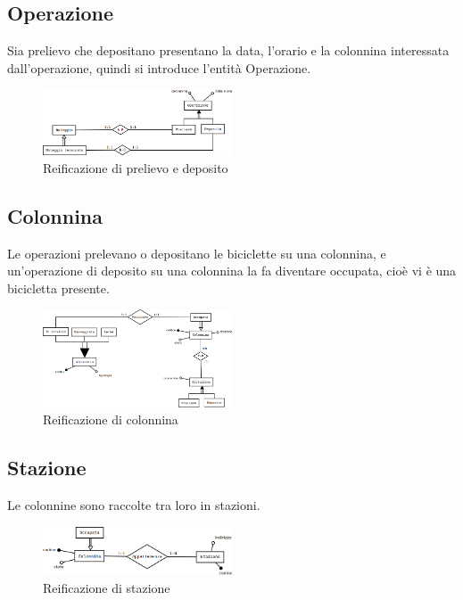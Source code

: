 \documentclass[a4paper,twoside]{article}
\begin{document}
\subsection{Operazione}
Sia prelievo che depositano presentano la data, l'orario e la colonnina interessata dall'operazione, quindi si introduce l'entità Operazione.
\begin{figure}[H]
 \centering
  \includegraphics[width=0.5\textwidth]{Immagini-Grafici/Concettuale07.png}
\caption{Reificazione di prelievo e deposito}
\end{figure}

\subsection{Colonnina}
Le operazioni prelevano o depositano le biciclette su una colonnina, e un'operazione di deposito su una colonnina la fa diventare occupata, cioè vi è una bicicletta presente.
\begin{figure}[H]
 \centering
  \includegraphics[width=0.5\textwidth]{Immagini-Grafici/Concettuale08.png}
\caption{Reificazione di colonnina}
\end{figure}

\subsection{Stazione}
Le colonnine sono raccolte tra loro in stazioni.
\begin{figure}[H]
 \centering
  \includegraphics[width=0.5\textwidth]{Immagini-Grafici/Concettuale09.png}
\caption{Reificazione di stazione}
\end{figure}
\end{document}
